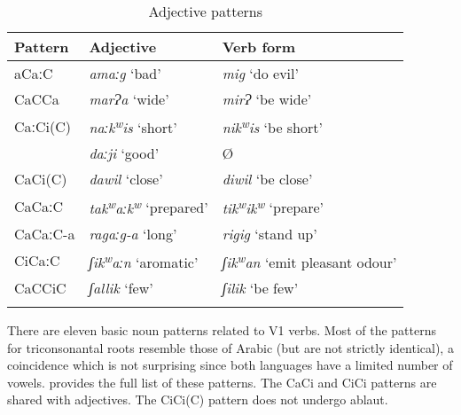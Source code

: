 \documentclass[output=paper]{langsci/langscibook}
\begin{document}
\begin{table}
\begin{tabular}{lll}
\lsptoprule
Pattern & Adjective & Verb form\\\midrule
aCaːC & \textit{amaːg} ‘bad’ & \textit{mig} ‘do evil’\\
CaCCa & \textit{marɁa} ‘wide’ & \textit{mirɁ} ‘be wide’\\
CaːCi(C) & \textit{naːk\textsuperscript{w}}\textit{is} ‘short’ & \textit{nik\textsuperscript{w}}\textit{is} ‘be short’\\
& \textit{daːji} ‘good’ & Ø\\
CaCi(C) & \textit{dawil} ‘close’ & \textit{diwil} ‘be close’\\
CaCaːC & \textit{tak\textsuperscript{w}}\textit{aːk\textsuperscript{w}} ‘prepared’ & \textit{tik\textsuperscript{w}}\textit{ik\textsuperscript{w}} ‘prepare’\\
CaCaːC-a & \textit{ragaːg-a} ‘long’ & \textit{rigig} ‘stand up’\\
CiCaːC & \textit{ʃik\textsuperscript{w}}\textit{aːn} ‘aromatic’ & \textit{ʃik\textsuperscript{w}}\textit{an} ‘emit pleasant odour’\\
CaCCiC & \textit{ʃallik} ‘few’ & \textit{ʃilik} ‘be few’\\
\lspbottomrule
\end{tabular} 
\caption{Adjective patterns}
\label{tab:vanhove:5}
\end{table}

There are eleven basic noun patterns related to V1 verbs. Most of the patterns for triconsonantal roots resemble those of Arabic (but are not strictly identical), a coincidence which is not surprising since both languages have a limited number of vowels.  provides the full list of these patterns. The CaCi and CiCi patterns are shared with adjectives. The CiCi(C) pattern does not undergo ablaut.
\end{document}
